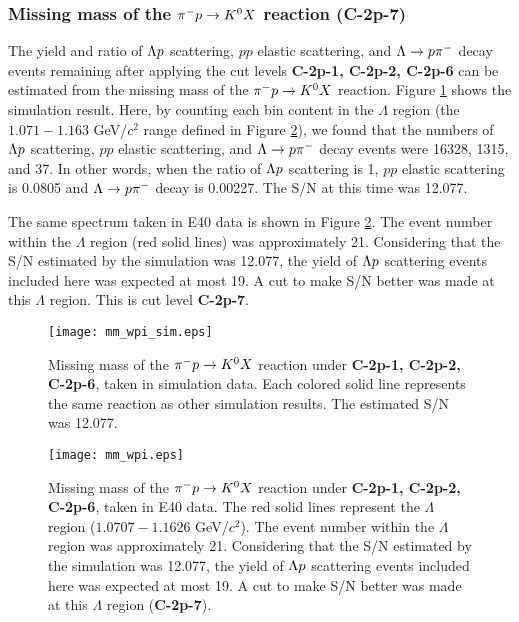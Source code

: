 \subsubsection{Missing mass of the $\pi^- p \to K^0 X$ reaction ({\bf C-2p-7})}

The yield and ratio of $\Lambda p$ scattering, $pp$ elastic scattering, and $\Lambda\to p\pi^{-}$ decay events remaining after applying the cut levels {\bf C-2p-1, C-2p-2, C-2p-6} can be estimated from the missing mass of the $\pi^- p \to K^0 X$ reaction. Figure \ref{fig-mm_wpi_sim} shows the simulation result. Here, by counting each bin content in the $\Lambda$ region (the $1.071-1.163$ GeV/$c^{2}$ range defined in Figure \ref{fig-mm_wpi}), we found that the numbers of $\Lambda p$ scattering, $pp$ elastic scattering, and $\Lambda\to p\pi^{-}$ decay events were 16328, 1315, and 37. In other words, when the ratio of $\Lambda p$ scattering is 1, $pp$ elastic scattering is 0.0805 and $\Lambda\to p\pi^{-}$ decay is 0.00227. The S/N at this time was 12.077. 

The same spectrum taken in E40 data is shown in Figure \ref{fig-mm_wpi}. The event number within the $\Lambda$ region (red solid lines) was approximately 21. Considering that the S/N estimated by the simulation was 12.077, the yield of $\Lambda p$ scattering events included here was expected at most 19. A cut to make S/N better was made at this $\Lambda$ region. This is cut level {\bf C-2p-7}.

\begin{figure}[!h]
  \begin{center}
    \texttt{[image: mm\_wpi\_sim.eps]}
    \caption{Missing mass of the $\pi^- p \to K^0 X$ reaction under {\bf C-2p-1, C-2p-2, C-2p-6}, taken in simulation data. Each colored solid line represents the same reaction as other simulation results. The estimated S/N was 12.077.}
    \label{fig-mm_wpi_sim}
  \end{center}
\end{figure}

\begin{figure}[!h]
  \begin{center}
    \texttt{[image: mm\_wpi.eps]}
    \caption{Missing mass of the $\pi^- p \to K^0 X$ reaction under {\bf C-2p-1, C-2p-2, C-2p-6}, taken in E40 data. The red solid lines represent the $\Lambda$ region ($1.0707-1.1626$ GeV/$c^{2}$). The event number within the $\Lambda$ region was approximately 21. Considering that the S/N estimated by the simulation was 12.077, the yield of $\Lambda p$ scattering events included here was expected at most 19. A cut to make S/N better was made at this $\Lambda$ region ({\bf C-2p-7}).}
    \label{fig-mm_wpi}
  \end{center}
\end{figure}

